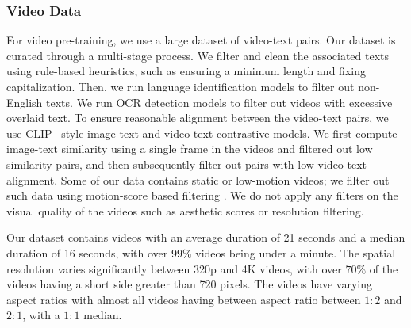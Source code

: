 \subsubsection{Video Data}
\label{subsubsection:vision_data_video}
For video pre-training, we use a large dataset of video-text pairs.
Our dataset is curated through a multi-stage process.
We filter and clean the associated texts using rule-based heuristics, such as ensuring a minimum length and fixing capitalization.
Then, we run language identification models to filter out non-English texts.
We run OCR detection models to filter out videos with excessive overlaid text.
To ensure reasonable alignment between the video-text pairs,
we use CLIP~\citep{radford2021learning} style image-text and video-text contrastive models. We first compute image-text similarity using a single frame in the videos and filtered out low similarity pairs, and then subsequently filter out pairs with low video-text alignment.
Some of our data contains static or low-motion videos; we filter out such data using motion-score based filtering \citep{girdhar2023emu}.
We do not apply any filters on the visual quality of the videos such as aesthetic scores or resolution filtering.

Our dataset contains videos with an average duration of 21 seconds and a median duration of 16 seconds, with over $99\%$ videos being under a minute.
The spatial resolution varies significantly between 320p and 4K videos, with over $70\%$ of the videos having a short side greater than 720 pixels.
The videos have varying aspect ratios with almost all videos having between aspect ratio between $1{:}2$ and $2{:}1$, with a $1{:}1$ median.
